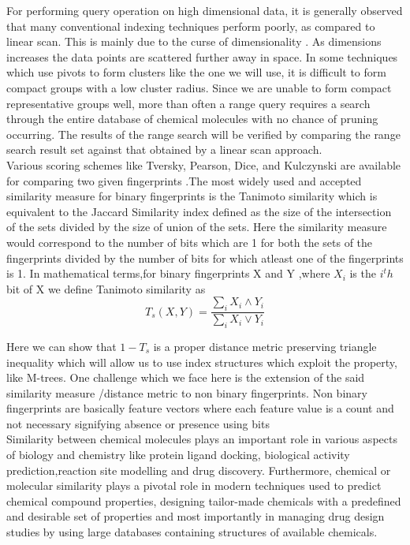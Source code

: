 	For performing query operation on high dimensional data, it is generally observed that many conventional indexing techniques perform poorly, as compared to linear scan. This is mainly due to the curse of dimensionality . As dimensions increases the data points are scattered further away in space. In some techniques which use pivots to form clusters like the one we will use, it is difficult to form compact groups with a low cluster radius. Since we are unable to form compact representative groups well, more than often a range query requires a search through the entire database of chemical molecules with no chance of pruning occurring.  The results of the range search will be verified by comparing the range search result set against that obtained by a linear scan approach.\\

	Various scoring schemes like Tversky, Pearson, Dice, and Kulczynski are available for comparing two given fingerprints \cite{willett2006similarity,swamidass2007bounds}.The most widely used and accepted similarity measure for binary fingerprints is the Tanimoto similarity which is equivalent to the Jaccard Similarity index defined as the size of the intersection of the sets divided by the size of union of the sets. Here the similarity measure would correspond to the number of bits which are 1 for both the sets of the fingerprints divided by the number of bits for which atleast one of the fingerprints is 1. In mathematical terms,for binary fingerprints X and Y ,where $X_i$ is the $i^th$ bit of X we define Tanimoto similarity as	
\begin{equation}
 T_s(X,Y) = \frac{\sum \limits_i X_i \wedge Y_i}
{\sum \limits_i X_i \vee Y_i} 
\end{equation}	

Here we can show that $1-T_s$ is a proper distance metric preserving triangle inequality which will allow us to use index structures which exploit the property, like M-trees. One challenge which we face here is the extension of the said similarity measure /distance metric to non binary fingerprints. Non binary fingerprints are basically feature vectors where each feature value is a count and not necessary signifying absence or presence using bits \\

	Similarity between chemical molecules plays an important role in various aspects of biology and chemistry like protein ligand docking, biological activity prediction,reaction site modelling and drug discovery. Furthermore, chemical or molecular similarity  plays a pivotal role in modern techniques used to predict chemical compound properties, designing tailor-made chemicals with a predefined and desirable set of properties and most importantly in managing drug design studies by using large databases containing structures of available chemicals.\\

